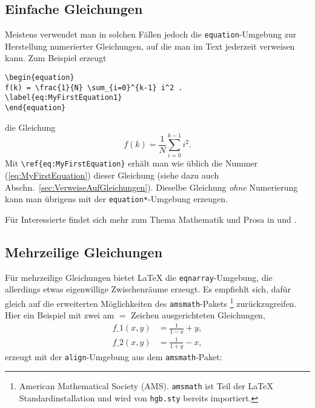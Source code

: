 \subsection{Einfache Gleichungen} 

Meistens verwendet man in solchen Fällen jedoch die \texttt{equation}-Umgebung zur Herstellung numerierter Gleichungen, auf die man im Text jederzeit verweisen kann. Zum Beispiel erzeugt
%
\begin{lstlisting}[style=Latex,caption={einfache Gleichung},label=lst:equ1]
\begin{equation}
f(k) = \frac{1}{N} \sum_{i=0}^{k-1} i^2 . 
\label{eq:MyFirstEquation1}
\end{equation}
\end{lstlisting}
%
die Gleichung
%
\begin{equation}
  f(k) = \frac{1}{N} \sum_{i=0}^{k-1} i^2 . 
\label{eq:MyFirstEquation}
\end{equation}
%
Mit \verb!\ref{eq:MyFirstEquation}! erhält man wie üblich die Nummer (\ref{eq:MyFirstEquation}) dieser Gleichung (siehe dazu auch Abschn.\ \ref{sec:VerweiseAufGleichungen}). 
Dieselbe Gleichung \emph{ohne} Numerierung kann man übrigens mit der \texttt{equation*}-Umgebung erzeugen.



\begin{center}
\setlength{\fboxrule}{0.2mm}
\setlength{\fboxsep}{2mm}
\end{center}
%
Für Interessierte findet sich mehr zum Thema Mathematik und Prosa in \autocite{Mermin89} und \autocite{Higham98}.

\subsection{Mehrzeilige Gleichungen}

Für mehrzeilige Gleichungen bietet \LaTeX{} die 
\verb!eqnarray!-Umgebung, die allerdings etwas eigenwillige Zwischenräume erzeugt.
Es empfiehlt sich, dafür gleich auf die erweiterten Möglichkeiten des \texttt{amsmath}-Pakets%
\footnote{American Mathematical Society (AMS). \texttt{amsmath} ist Teil der \LaTeX{} Standardinstallation und wird von \texttt{hgb.sty} bereits importiert.}
\autocite{amsldoc02} zurückzugreifen.
Hier ein Beispiel mit zwei am $=$ Zeichen ausgerichteten Gleichungen,
%
\begin{align}
f\_1 (x,y) &= \frac{1}{1-x} + y , \label{eq:f1} \\
f\_2 (x,y) &= \frac{1}{1+y} - x , \label{eq:f2}
\end{align}
%
erzeugt mit der \texttt{align}-Umgebung aus dem \texttt{amsmath}-Paket:
%

